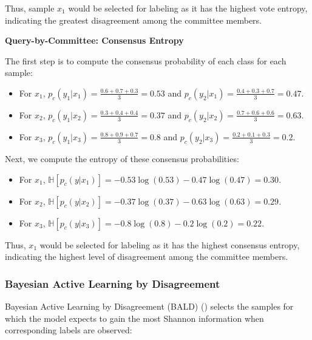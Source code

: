 \documentclass[
  letterpaper,
  numbers=noenddot,
  DIV=11]{scrreprt}
\providecommand{\tightlist}{%
  \setlength{\itemsep}{0pt}\setlength{\parskip}{0pt}}\usepackage{longtable,booktabs,array}
\theoremstyle{definition}
\theoremstyle{plain}
\theoremstyle{plain}
\theoremstyle{remark}
\begin{document}
Thus, sample \(x_1\) would be selected for labeling as it has the
highest vote entropy, indicating the greatest disagreement among the
committee members.

\textbf{Query-by-Committee: Consensus Entropy}

The first step is to compute the consensus probability of each class for
each sample:

\begin{itemize}
\tightlist
\item
  For \(x_1\), \(p_c(y_1|x_1) = \frac{0.6 + 0.7 + 0.3}{3} = 0.53\) and
  \(p_c(y_2|x_1) = \frac{0.4 + 0.3 + 0.7}{3} = 0.47\).
\item
  For \(x_2\), \(p_c(y_1|x_2) = \frac{0.3 + 0.4 + 0.4}{3} = 0.37\) and
  \(p_c(y_2|x_2) = \frac{0.7 + 0.6 + 0.6}{3} = 0.63\).
\item
  For \(x_3\), \(p_c(y_1|x_3) = \frac{0.8 + 0.9 + 0.7}{3} = 0.8\) and
  \(p_c(y_2|x_3) = \frac{0.2 + 0.1 + 0.3}{3} = 0.2\).
\end{itemize}

Next, we compute the entropy of these consensus probabilities:

\begin{itemize}
\tightlist
\item
  For \(x_1\),
  \(\mathbb{H}[p_c(y|x_1)] = -0.53 \log (0.53) - 0.47 \log (0.47) = 0.30\).
\item
  For \(x_2\),
  \(\mathbb{H}[p_c(y|x_2)] = -0.37 \log (0.37) - 0.63 \log (0.63) = 0.29\).
\item
  For \(x_3\),
  \(\mathbb{H}[p_c(y|x_3)] = -0.8 \log (0.8) - 0.2 \log (0.2) = 0.22\).
\end{itemize}

Thus, \(x_1\) would be selected for labeling as it has the highest
consensus entropy, indicating the highest level of disagreement among
the committee members.

\subsubsection*{Bayesian Active Learning by
Disagreement}\label{bayesian-active-learning-by-disagreement}

Bayesian Active Learning by Disagreement (BALD)
() selects the samples for
which the model expects to gain the most Shannon information when
corresponding labels are observed:
\end{document}
